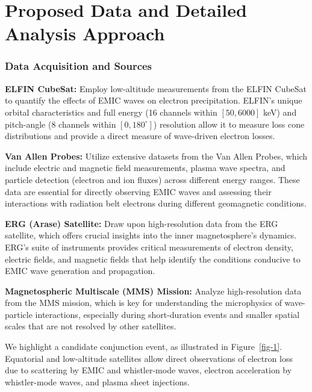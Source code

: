 \documentclass[
  letterpaper,
  DIV=11,
  numbers=noendperiod]{scrartcl}
\begin{document}
\section{Proposed Data and Detailed Analysis Approach}\label{proposed-data-and-detailed-analysis-approach}

\subsubsection{Data Acquisition and Sources}\label{data-acquisition-and-sources}

\textbf{ELFIN CubeSat:} Employ low-altitude measurements from the ELFIN CubeSat to quantify the effects of EMIC waves on electron precipitation. ELFIN's unique orbital characteristics and full energy (16 channels within \([50,6000]\) keV) and pitch-angle (8 channels within \([0,180^\circ]\)) resolution allow it to measure loss cone distributions and provide a direct measure of wave-driven electron losses.

\textbf{Van Allen Probes:} Utilize extensive datasets from the Van Allen Probes, which include electric and magnetic field measurements, plasma wave spectra, and particle detection (electron and ion fluxes) across different energy ranges. These data are essential for directly observing EMIC waves and assessing their interactions with radiation belt electrons during different geomagnetic conditions.

\textbf{ERG (Arase) Satellite:} Draw upon high-resolution data from the ERG satellite, which offers crucial insights into the inner magnetosphere's dynamics. ERG's suite of instruments provides critical measurements of electron density, electric fields, and magnetic fields that help identify the conditions conducive to EMIC wave generation and propagation.

\textbf{Magnetospheric Multiscale (MMS) Mission:} Analyze high-resolution data from the MMS mission, which is key for understanding the microphysics of wave-particle interactions, especially during short-duration events and smaller spatial scales that are not resolved by other satellites.

We highlight a candidate conjunction event, as illustrated in Figure~\ref{fig-1}. Equatorial and low-altitude satellites allow direct observations of electron loss due to scattering by EMIC and whistler-mode waves, electron acceleration by whistler-mode waves, and plasma sheet injections.
\end{document}

